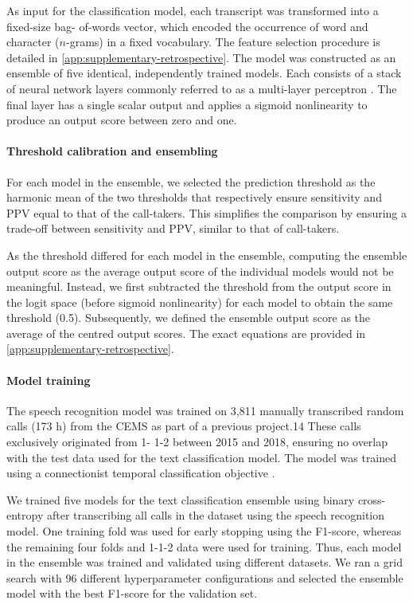 {As input for the classification model, each transcript was transformed into a fixed-size bag- of-words vector, which encoded the occurrence of word and character ($n$-grams) in a fixed vocabulary. The feature selection procedure is detailed in \cref{app:supplementary-retrospective}. The model was constructed as an ensemble \cite{hansen_neural_1990} of five identical, independently trained models. Each consists of a stack of neural network layers commonly referred to as a multi-layer perceptron \cite{rosenblatt_perceptron_1958}. The final layer has a single scalar output and applies a sigmoid nonlinearity to produce an output score between zero and one.


\paragraph{Threshold calibration and ensembling}

For each model in the ensemble, we selected the prediction threshold as the harmonic mean of the two thresholds that respectively ensure sensitivity and PPV equal to that of the call-takers. This simplifies the comparison by ensuring a trade-off between sensitivity and PPV, similar to that of call-takers.

As the threshold differed for each model in the ensemble, computing the ensemble output score as the average output score of the individual models would not be meaningful. Instead, we first subtracted the threshold from the output score in the logit space (before sigmoid nonlinearity) for each model to obtain the same threshold (0.5). Subsequently, we defined the ensemble output score as the average of the centred output scores. The exact equations are provided in \cref{app:supplementary-retrospective}.


\paragraph{Model training}

The speech recognition model was trained on 3,811 manually transcribed random calls (173 h) from the CEMS as part of a previous project.14 These calls exclusively originated from 1- 1-2 between 2015 and 2018, ensuring no overlap with the test data used for the text classification model. The model was trained using a connectionist temporal classification objective \cite{graves_connectionist_2006}.

We trained five models for the text classification ensemble using binary cross-entropy after transcribing all calls in the dataset using the speech recognition model. One training fold was used for early stopping using the F1-score, whereas the remaining four folds and 1-1-2 data were used for training. Thus, each model in the ensemble was trained and validated using different datasets. We ran a grid search with 96 different hyperparameter configurations and selected the ensemble model with the best F1-score for the validation set. 


}
